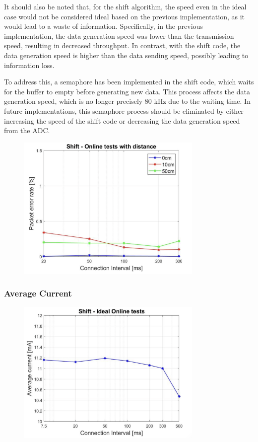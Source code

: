 \documentclass{Configuration_Files/PoliMi3i_thesis}
\begin{document}
It should also be noted that, for the shift algorithm, the speed even in the ideal case would not be considered ideal based on the previous implementation, as it would lead to a waste of information. Specifically, in the previous implementation, the data generation speed was lower than the transmission speed, resulting in decreased throughput. In contrast, with the shift code, the data generation speed is higher than the data sending speed, possibly leading to information loss.

To address this, a semaphore has been implemented in the shift code, which waits for the buffer to empty before generating new data. This process affects the data generation speed, which is no longer precisely 80 kHz due to the waiting time. In future implementations, this semaphore process should be eliminated by either increasing the speed of the shift code or decreasing the data generation speed from the ADC.

\begin{figure}[H]
    \centering
    \includegraphics[width=0.8\textwidth]{Results Manuel/figure18}
    \label{fig:figure1}
\end{figure}

\subsubsection*{Average Current}

\begin{figure}[H]
    \centering
    \includegraphics[width=0.8\textwidth]{Results Manuel/figure19}
    \label{fig:figure1}
\end{figure}
\end{document}
